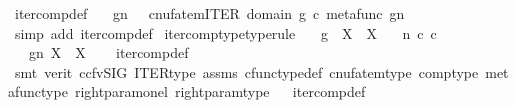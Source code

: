 \begin{isabellebody}
\isanewline
{}\isamarkupfalse%
\ iter{\isacharunderscore}{\kern0pt}comp{\isacharunderscore}{\kern0pt}def{}{\isacharcolon}{\kern0pt}\ \isanewline
\ \ {\isachardoublequoteopen}g\isactrlbsup {\isasymcirc}n\isactrlesup \ \ {\isasymequiv}\ cnufatem{\isacharparenleft}{\kern0pt}ITER\ {\isacharparenleft}{\kern0pt}domain\ g{\isacharparenright}{\kern0pt}\ {\isasymcirc}\isactrlsub c\ {\isasymlangle}metafunc\ g{\isacharcomma}{\kern0pt}n{\isasymrangle}{\isacharparenright}{\kern0pt}{\isachardoublequoteclose}\isanewline
%
\isadelimproof
\ \ %
\endisadelimproof
%
\isatagproof
{}\isamarkupfalse%
\ {\isacharparenleft}{\kern0pt}simp\ add{\isacharcolon}{\kern0pt}\ iter{\isacharunderscore}{\kern0pt}comp{\isacharunderscore}{\kern0pt}def{\isacharparenright}{\kern0pt}%
\endisatagproof
{\isafoldproof}%
%
\isadelimproof
\isanewline
%
\endisadelimproof
\isanewline
{}\isamarkupfalse%
\ iter{\isacharunderscore}{\kern0pt}comp{\isacharunderscore}{\kern0pt}type{\isacharbrackleft}{\kern0pt}type{\isacharunderscore}{\kern0pt}rule{\isacharbrackright}{\kern0pt}{\isacharcolon}{\kern0pt}\isanewline
\ \ \ {\isachardoublequoteopen}g\ {\isacharcolon}{\kern0pt}\ X\ {\isasymrightarrow}\ X{\isachardoublequoteclose}\isanewline
\ \ \ {\isachardoublequoteopen}n\ {\isasymin}\isactrlsub c\ {\isasymnat}\isactrlsub c{\isachardoublequoteclose}\isanewline
\ \ \ {\isachardoublequoteopen}g\isactrlbsup {\isasymcirc}n\isactrlesup {\isacharcolon}{\kern0pt}\ X\ {\isasymrightarrow}\ X{\isachardoublequoteclose}\isanewline
%
\isadelimproof
\ \ %
\endisadelimproof
%
\isatagproof
{}\isamarkupfalse%
\ iter{\isacharunderscore}{\kern0pt}comp{\isacharunderscore}{\kern0pt}def{}\isanewline
\ \ \isamarkupfalse%
\ {\isacharparenleft}{\kern0pt}smt\ {\isacharparenleft}{\kern0pt}verit{\isacharcomma}{\kern0pt}\ ccfv{\isacharunderscore}{\kern0pt}SIG{\isacharparenright}{\kern0pt}\ ITER{\isacharunderscore}{\kern0pt}type\ assms\ cfunc{\isacharunderscore}{\kern0pt}type{\isacharunderscore}{\kern0pt}def\ cnufatem{\isacharunderscore}{\kern0pt}type\ comp{\isacharunderscore}{\kern0pt}type\ metafunc{\isacharunderscore}{\kern0pt}type\ right{\isacharunderscore}{\kern0pt}param{\isacharunderscore}{\kern0pt}on{\isacharunderscore}{\kern0pt}el\ right{\isacharunderscore}{\kern0pt}param{\isacharunderscore}{\kern0pt}type{\isacharparenright}{\kern0pt}%
\endisatagproof
{\isafoldproof}%
%
\isadelimproof
\ \isanewline
%
\endisadelimproof
\isanewline
{}\isamarkupfalse%
\ iter{\isacharunderscore}{\kern0pt}comp{\isacharunderscore}{\kern0pt}def{}{\isacharcolon}{\kern0pt}\ \isanewline

\end{isabellebody}
